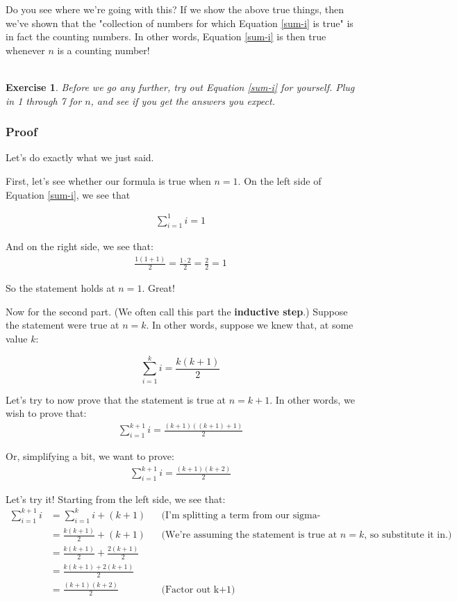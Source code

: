 \documentclass{book}
\newtheorem{exercise}{\\ \bf Exercise}
\begin{document}
Do you see where we're going with this? If we show the above true things, then we've shown that the "collection of numbers for which Equation \ref{sum-i} is true" is in fact the counting numbers. In other words, Equation \ref{sum-i} is then true whenever $n$ is a counting number!

\begin{exercise}
Before we go any further, try out Equation \ref{sum-i} for yourself. Plug in 1 through 7 for $n$, and see if you get the answers you expect. 
\end{exercise}

\subsubsection{Proof}

Let's do exactly what we just said.

First, let's see whether our formula is true when $n=1$. On the left side of Equation \ref{sum-i}, we see that 

\begin{align*}
\sum_{i=1}^{1} i = 1
\end{align*}

And on the right side, we see that:
\begin{align*}
\frac{1(1+1)}{2} = \frac{1 \cdot 2}{2} = \frac{2}{2} = 1
\end{align*}

So the statement holds at $n = 1$. Great!

Now for the second part. (We often call this part the \textbf{inductive step}.) Suppose the statement were true at $n = k$. In other words, suppose we knew that, at some value $k$:

\begin{equation*}
\label{sum-i}
\sum_{i=1}^k i = \frac{k(k+1)}{2}
\end{equation*}

Let's try to now prove that the statement is true at $n = k + 1$. In other words, we wish to prove that:
\begin{align*}
\sum_{i=1}^{k+1} i = \frac{(k+1)((k+1)+1)}{2}
\end{align*}

Or, simplifying a bit, we want to prove:
\begin{align*}
\sum_{i=1}^{k+1} i = \frac{(k+1)(k+2)}{2}
\end{align*}

Let's try it! Starting from the left side, we see that:
\begin{align*}
\sum_{i=1}^{k+1} i &= \sum_{i=1}^{k} i + (k+1) && \text{(I'm splitting a term from our sigma-expression. See why it works?)} \\
&= \frac{k(k+1)}{2} + (k+1) && \text{(We're assuming the statement is true at $n=k$, so substitute it in.)} \\
&= \frac{k(k+1)}{2} + \frac{2(k+1)}{2} \\
&= \frac{k(k+1) + 2(k+1)}{2} \\
&= \frac{(k+1)(k+2)}{2} && \text{(Factor out k+1)}\\
\end{align*}
\end{document}

